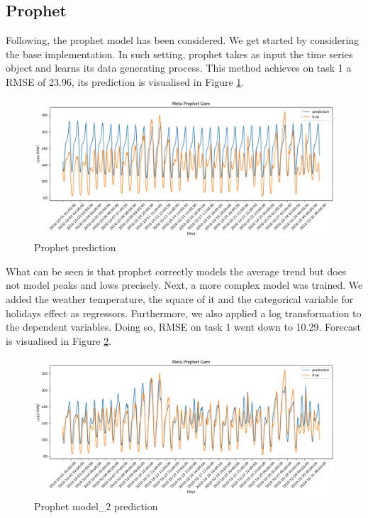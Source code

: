 \subsection{Prophet}
Following, the prophet model has been considered. 
We get started by considering the base implementation. In such setting, prophet takes as input the time series object and learns its data generating process.
This method achieves on task 1 a RMSE of 23.96, its prediction is visualised in Figure \ref{fig:prophet_price_1}.
\begin{figure}[!ht]
    \includegraphics[width=\textwidth]{images/prophet_price_1.png}
    \caption{Prophet prediction}
    \label{fig:prophet_price_1}
\end{figure}
What can be seen is that prophet correctly models the average trend but does not model peaks and lows precisely. 
Next, a more complex model was trained. We added the weather temperature, the square of it and the categorical variable for holidays effect as regressors. Furthermore, we also applied a log transformation to the dependent variables. Doing so, RMSE on task 1 went down to 10.29. Forecast is visualised in Figure \ref{fig:prophet_price2}.
\begin{figure}[!ht]
    \includegraphics[width=\textwidth]{images/prophet_price2.png}
    \caption{Prophet model\_2 prediction}
    \label{fig:prophet_price2}
\end{figure}

